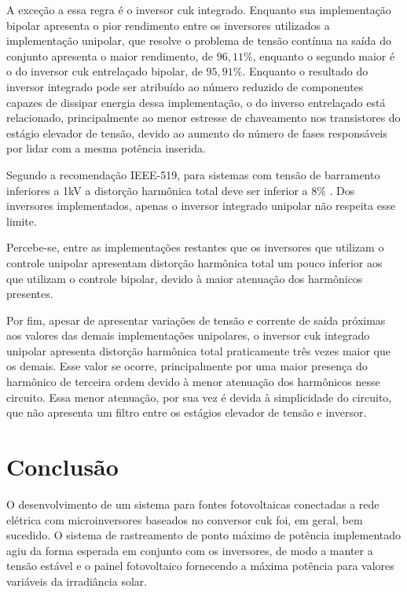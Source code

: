 \documentclass[
	12pt,				%
	openany,
	onseside,
	a4paper,			%
	english,			%
	french,				%
	spanish,			%
	brazil,				%
	]{abntex2}
\begin{document}
A exceção a essa regra é o inversor cuk integrado. Enquanto sua implementação bipolar apresenta o pior rendimento entre os inversores utilizados a implementação unipolar, que resolve o problema de tensão contínua na saída do conjunto apresenta o maior rendimento, de $96,11\%$, enquanto o segundo maior é o do inversor cuk entrelaçado bipolar, de $95,91\%$. Enquanto o resultado do inversor integrado pode ser atribuído ao número reduzido de componentes capazes de dissipar energia dessa implementação, o do inverso entrelaçado está relacionado, principalmente ao menor estresse de chaveamento nos transistores do estágio elevador de tensão, devido ao aumento do número de fases responsáveis por lidar com a mesma potência inserida.

Segundo a recomendação IEEE-519, para sistemas com tensão de barramento inferiores a 1kV a distorção harmônica total deve ser inferior a $8\%$ \cite{IEEE_519}. Dos inversores implementados, apenas o inversor integrado unipolar não respeita esse limite.

Percebe-se, entre as implementações restantes que os inversores que utilizam o controle unipolar apresentam distorção harmônica total um pouco inferior aos que utilizam o controle bipolar, devido à maior atenuação dos harmônicos presentes.

Por fim, apesar de apresentar variações de tensão e corrente de saída próximas aos valores das demais implementações unipolares, o inversor cuk integrado unipolar apresenta distorção harmônica total praticamente três vezes maior que os demais. Esse valor se ocorre, principalmente por uma maior presença do harmônico de terceira ordem devido à menor atenuação dos harmônicos nesse circuito. Essa menor atenuação, por sua vez é devida à simplicidade do circuito, que não apresenta um filtro entre os estágios elevador de tensão e inversor.

\chapter{Conclusão}

O desenvolvimento de um sistema para fontes fotovoltaicas conectadas a rede elétrica com microinversores baseados no conversor cuk foi, em geral, bem sucedido. O sistema de rastreamento de ponto máximo de potência implementado agiu da forma esperada em conjunto com os inversores, de modo a manter a tensão estável e o painel fotovoltaico fornecendo a máxima potência para valores variáveis da irradiância solar.
\end{document}
